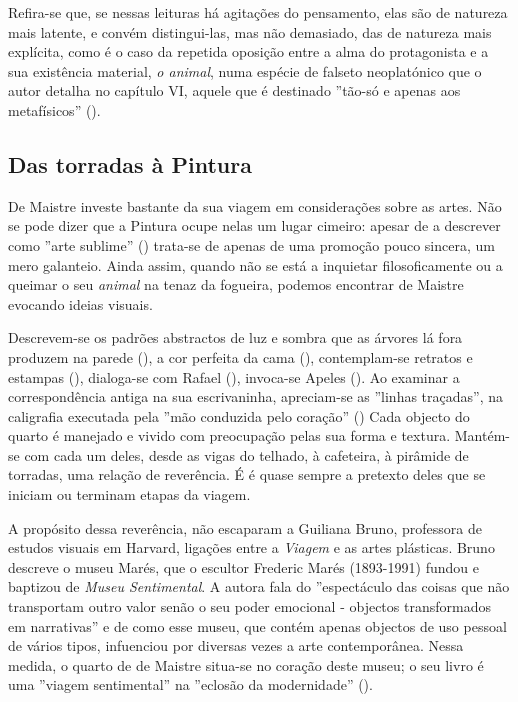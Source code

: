 \documentclass[12pt]{article}
\begin{document}
Refira-se que, se nessas leituras há agitações do pensamento, elas são
de natureza mais latente, e convém distingui-las, mas não demasiado,
das de natureza mais explícita, como é o caso da repetida oposição
entre a alma do protagonista e a sua existência material, \emph{o
  animal}, numa espécie de falseto neoplatónico que o autor detalha no
capítulo VI, aquele que é destinado ''tão-só e apenas aos
metafísicos'' (\cite[p.25]{demaistre}).

\subsection{Das torradas à Pintura}

De Maistre investe bastante da sua viagem em considerações sobre as
artes. Não se pode dizer que a Pintura ocupe nelas um lugar cimeiro:
apesar de a descrever como ''arte sublime'' (\cite[p.27]{demaistre})
trata-se de apenas de uma promoção pouco sincera, um mero
galanteio. Ainda assim, quando não se está a inquietar filosoficamente
ou a queimar o seu \emph{animal} na tenaz da fogueira, podemos
encontrar de Maistre evocando ideias visuais.

Descrevem-se os padrões abstractos de luz e sombra que as árvores lá
fora produzem na parede (\cite[p.23]{demaistre}), a cor perfeita da
cama (\cite[p.53]{demaistre}), contemplam-se retratos e estampas
(\cite[p.34]{demaistre}), dialoga-se com Rafael
(\cite[p.65]{demaistre}), invoca-se Apeles
(\cite[p.69]{demaistre}). Ao examinar a correspondência antiga na sua
escrivaninha, apreciam-se as ''linhas traçadas'', na caligrafia
executada pela ''mão conduzida pelo coração'' (\cite[p.84]{demaistre})
Cada objecto do quarto é manejado e vivido com preocupação pelas sua
forma e textura. Mantém-se com cada um deles, desde as vigas do
telhado, à cafeteira, à pirâmide de torradas, uma relação de
reverência. É é quase sempre a pretexto deles que se iniciam ou
terminam etapas da viagem.

A propósito dessa reverência, não escaparam a Guiliana Bruno,
professora de estudos visuais em Harvard, ligações entre a
\emph{Viagem} e as artes plásticas. Bruno descreve o museu Marés, que
o escultor Frederic Marés (1893-1991) fundou e baptizou de \emph{Museu
  Sentimental}. A autora fala do ''espectáculo das coisas que não
transportam outro valor senão o seu poder emocional - objectos
transformados em narrativas'' e de como esse museu, que contém apenas
objectos de uso pessoal de vários tipos, infuenciou por diversas vezes
a arte contemporânea. Nessa medida, o quarto de de Maistre situa-se no
coração deste museu; o seu livro é uma ''viagem sentimental'' na
''eclosão da modernidade'' (\cite[p.133]{bruno2002atlas}).
\end{document}
